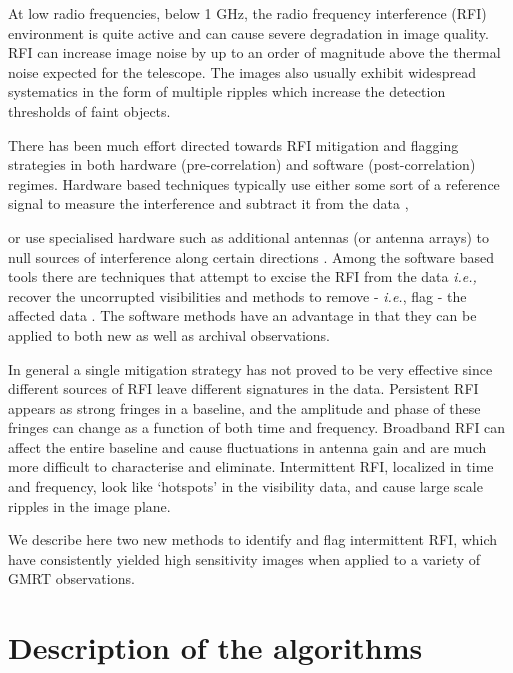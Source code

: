 \documentclass[twocolumn]{aastex61}
\begin{document}
At low radio frequencies, below 1 GHz, the radio frequency interference
(RFI) environment is quite active and can cause severe degradation in image
quality. RFI can increase image noise by up to an order of magnitude above
the thermal noise expected for the telescope. The images also usually
exhibit widespread systematics in the form of multiple ripples which increase
the detection thresholds of faint objects.

There has been much effort directed towards RFI mitigation and flagging
strategies in both hardware (pre-correlation) and software (post-correlation)
regimes.  Hardware based techniques typically use either some sort of
a reference signal to measure the interference and subtract it from the data
\citep{briggs_removing_2000, barnbaum_new_1998,
hellbourg_reference_2014,fridman2001rfi}, {or use specialised hardware
such as additional antennas (or antenna arrays) to null sources of
interference along certain directions \citep{van2004spatial,kocz2010radio}.
Among the software based tools there are techniques that attempt to excise
the RFI from the data \emph{i.e.,} recover the uncorrupted visibilities
\citep{athreya_new_2009, golap_post_2005, pen_gmrt_2009, offringa2012post} and
methods to remove - \emph{i.e.}, flag - the affected data
\citep{offringa_morphological_2012, offringa_post-correlation_2010,
bhat2005radio, middelberg2006automated, winkel2007rfi}. The software methods
have an advantage in that they can be applied to both new as well as archival
observations.

In general a single mitigation strategy has not proved to be very effective
since different sources of RFI leave different signatures in the data.
Persistent RFI appears as strong fringes in a baseline, and the amplitude and
phase of these fringes can change as a function of both time and frequency.
Broadband RFI can affect the entire baseline and cause fluctuations in antenna
gain and are much more difficult to characterise and eliminate. Intermittent
RFI, localized in time and frequency, look like `hotspots' in the visibility
data, and cause large scale ripples in the image plane.

We describe here two new methods to identify and flag intermittent RFI,
which have consistently yielded high sensitivity images when applied to
a variety of GMRT observations.

\section{Description of the algorithms}

}
\end{document}
